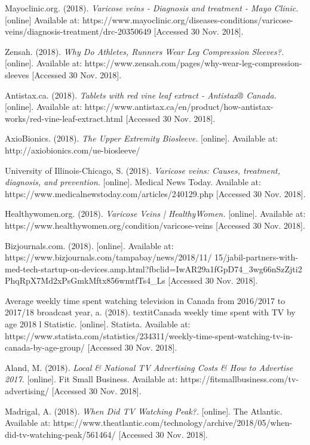 \documentclass[11.5pt]{article}
\begin{document}
\begin{thebibliography}{9}

Mayoclinic.org. (2018). \textit{Varicose veins - Diagnosis and treatment - Mayo Clinic.} [online] Available at: https://www.mayoclinic.org/diseases-conditions/varicose-veins/diagnosis-treatment/drc-20350649 [Accessed 30 Nov. 2018].

Zensah. (2018). \textit{Why Do Athletes, Runners Wear Leg Compression Sleeves?.} [online]. Available at: https://www.zensah.com/pages/why-wear-leg-compression-sleeves [Accessed 30 Nov. 2018].

Antistax.ca. (2018). \textit{Tablets with red vine leaf extract - Antistax® Canada.} [online]. Available at: https://www.antistax.ca/en/product/how-antistax-works/red-vine-leaf-extract.html [Accessed 30 Nov. 2018].

AxioBionics. (2018). \textit{The Upper Extremity Biosleeve.} [online]. Available at: http://axiobionics.com/ue-biosleeve/ 

University of Illinois-Chicago, S. (2018). \textit{Varicose veins: Causes, treatment, diagnosis, and prevention.} [online]. Medical News Today. Available at: https://www.medicalnewstoday.com/articles/240129.php [Accessed 30 Nov. 2018].

Healthywomen.org. (2018). \textit{Varicose Veins | HealthyWomen.} [online]. Available at: https://www.healthywomen.org/condition/varicose-veins [Accessed 30 Nov. 2018].

Bizjournals.com. (2018). [online]. Available at: https://www.bizjournals.com/tampabay/news/2018/11/ 15/jabil-partners-with-med-tech-startup-on-devices.amp.html?fbclid=IwAR29a1fGpD74\_3wg66nSzZjti2 PhqRpX7Md2xPsGmkMftx856wmtfTs4\_Ls [Accessed 30 Nov. 2018].

Average weekly time spent watching television in Canada from 2016/2017 to 2017/18 broadcast year, a. (2018). textit{Canada weekly time spent with TV by age 2018 l Statistic.} [online]. Statista. Available at: https://www.statista.com/statistics/234311/weekly-time-spent-watching-tv-in-canada-by-age-group/ [Accessed 30 Nov. 2018].

Aland, M. (2018). \textit{Local \& National TV Advertising Costs \& How to Advertise 2017.} [online]. Fit Small Business. Available at: https://fitsmallbusiness.com/tv-advertising/ [Accessed 30 Nov. 2018].

Madrigal, A. (2018). \textit{When Did TV Watching Peak?.} [online]. The Atlantic. Available at: https://www.theatlantic.com/technology/archive/2018/05/when-did-tv-watching-peak/561464/ [Accessed 30 Nov. 2018]. 


\end{thebibliography}
\end{document}
